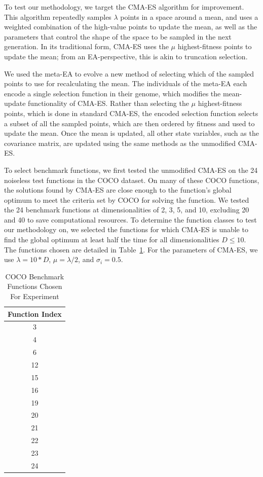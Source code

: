 \documentclass[sigconf]{acmart}
\begin{document}
To test our methodology, we target the CMA-ES algorithm for improvement. This algorithm repeatedly samples $\lambda$ points in a space around a mean, and uses a weighted combination of the high-value points to update the mean, as well as the parameters that control the shape of the space to be sampled in the next generation. In its traditional form, CMA-ES uses the $\mu$ highest-fitness points to update the mean; from an EA-perspective, this is akin to truncation selection. 

We used the meta-EA to evolve a new method of selecting which of the sampled points to use for recalculating the mean. The individuals of the meta-EA each encode a single selection function in their genome, which modifies the mean-update functionality of CMA-ES. Rather than selecting the $\mu$ highest-fitness points, which is done in standard CMA-ES, the encoded selection function selects a subset of all the sampled points, which are then ordered by fitness and used to update the mean. Once the mean is updated, all other state variables, such as the covariance matrix, are updated using the same methods as the unmodified CMA-ES.

To select benchmark functions, we first tested the unmodified CMA-ES on the 24 noiseless test functions in the COCO dataset. On many of these COCO functions, the solutions found by CMA-ES are close enough to the function's global optimum to meet the criteria set by COCO for solving the function. We tested the 24 benchmark functions at dimensionalities of 2, 3, 5, and 10, excluding 20 and 40 to save computational resources. To determine the function classes to test our methodology on, we selected the functions for which CMA-ES is unable to find the global optimum at least half the time for all dimensionalities $D\leq10$. The functions chosen are detailed in Table~\ref{tab:experiment3chosenFunctions}. For the parameters of CMA-ES, we use $\lambda=10*D$, $\mu = \lambda/2$, and $\sigma_i = 0.5$. 

\begin{table}
	\centering
	\caption{COCO Benchmark Functions Chosen For Experiment}
	\label{tab:experiment3chosenFunctions}
	\begin{tabular}{c}
		\toprule
		Function Index \\
		\midrule
		3 \\
		\hline
		4 \\
		\hline
		6\\
		\hline
		12\\
		\hline
		15\\
		\hline
		16\\
		\hline
		19\\
		\hline
		20\\
		\hline
		21\\
		\hline
		22\\
		\hline
		23\\
		\hline
		24\\                        
		
		\bottomrule
	\end{tabular}
\end{table}
\end{document}
